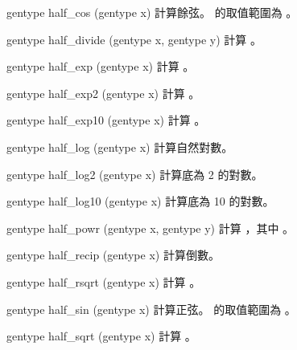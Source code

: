 gentype half_cos (gentype x) 
\stopbuffer
{}
計算餘弦。  的取值範圍為 。
\stopbuffer

gentype half_divide (gentype x, 
		gentype y) 
\stopbuffer
{}
計算 。
\stopbuffer

gentype half_exp (gentype x) 
\stopbuffer
{}
計算 。
\stopbuffer

gentype half_exp2 (gentype x) 
\stopbuffer
{}
計算 。
\stopbuffer

gentype half_exp10 (gentype x) 
\stopbuffer
{}
計算 。
\stopbuffer

gentype half_log (gentype x) 
\stopbuffer
{}
計算自然對數。
\stopbuffer

gentype half_log2 (gentype x) 
\stopbuffer
{}
計算底為 2 的對數。
\stopbuffer

gentype half_log10 (gentype x) 
\stopbuffer
{}
計算底為 10 的對數。
\stopbuffer

gentype half_powr (gentype x,
		gentype y)
\stopbuffer
{}
計算 ，其中 。
\stopbuffer

gentype half_recip (gentype x)
\stopbuffer
{}
計算倒數。
\stopbuffer

gentype half_rsqrt (gentype x)
\stopbuffer
{}
計算 。
\stopbuffer

gentype half_sin (gentype x)
\stopbuffer
{}
計算正弦。  的取值範圍為 。
\stopbuffer

gentype half_sqrt (gentype x)
\stopbuffer
{}
計算 。
\stopbuffer


